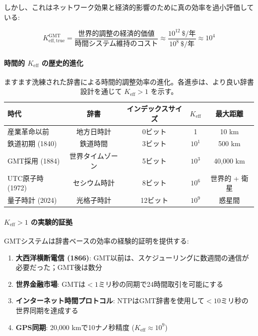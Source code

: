 \documentclass[11pt,a4paper]{article}
\begin{document}
	しかし、これはネットワーク効果と経済的影響のために真の効率を過小評価している:
	
	\begin{equation}
		K_{\mathrm{eff, true}}^{\mathrm{GMT}} = \frac{\text{世界的調整の経済的価値}}{\text{時間システム維持のコスト}} \approx \frac{10^{12}\ \text{\$/年}}{10^8\ \text{\$/年}} \approx 10^4
	\end{equation}
	
	\paragraph{時間的 $K_{\mathrm{eff}}$ の歴史的進化}
	\begin{table}[htbp]
		\centering
		
			\begin{tabular}{lcccc}
				\toprule
				\textbf{時代} & \textbf{辞書} & \textbf{インデックスサイズ} & \textbf{$K_{\mathrm{eff}}$} & \textbf{最大距離} \\
				\midrule
				産業革命以前 & 地方日時計 & 0ビット & 1 & 10 km \\
				鉄道初期 (1840) & 鉄道時間 & 3ビット & $10^1$ & 500 km \\
				GMT採用 (1884) & 世界タイムゾーン & 5ビット & $10^3$ & 40,000 km \\
				UTC原子時 (1972) & セシウム時計 & 8ビット & $10^6$ & 世界的 + 衛星 \\
				量子時計 (2024) & 光格子時計 & 12ビット & $10^9$ & 惑星間 \\
				\bottomrule
			\end{tabular}
		
		\caption{ますます洗練された辞書による時間的調整効率の進化。各進歩は、より良い辞書設計を通じて $K_{\mathrm{eff}} > 1$ を示す。}
		\label{tab:time-keff-evolution}
	\end{table}
	
	\paragraph{$K_{\mathrm{eff}} > 1$ の実験的証拠}
	GMTシステムは辞書ベースの効率の経験的証明を提供する:
	\begin{enumerate}
		\item \textbf{大西洋横断電信 (1866)}: GMT以前は、スケジューリングに数週間の通信が必要だった；GMT後は数分
		\item \textbf{世界金融市場}: GMTは$<1$ミリ秒の同期で24時間取引を可能にする
		\item \textbf{インターネット時間プロトコル}: NTPはGMT辞書を使用して$<10$ミリ秒の世界同期を達成する
		\item \textbf{GPS同期}: 20,000 kmで10ナノ秒精度 ($K_{\mathrm{eff}} \approx 10^9$)
	\end{enumerate}
	
\end{document}
